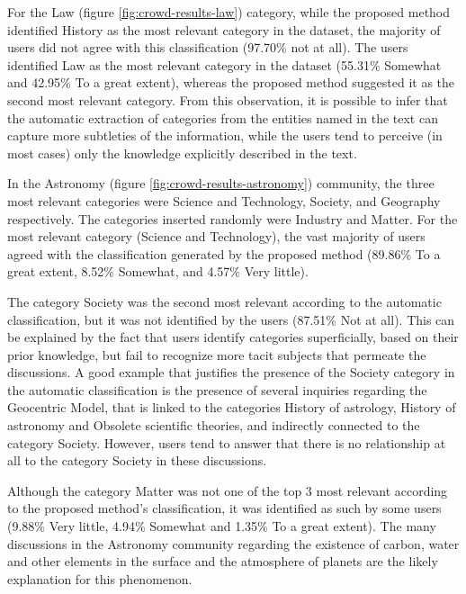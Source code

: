 For the Law (figure \ref{fig:crowd-results-law}) category, while the proposed method identified History as the most relevant category in the dataset, the majority of users did not agree with this classification (97.70\% not at all). 
The users identified Law as the most relevant category in the dataset (55.31\% Somewhat and 42.95\% To a great extent), whereas the proposed method suggested it as the second most relevant category. 
From this observation, it is possible to infer that the automatic extraction of categories from the entities named in the text can capture more subtleties of the information, while the users tend to perceive (in most cases) only the knowledge explicitly described in the text.


 
 \newpage
In the Astronomy (figure \ref{fig:crowd-results-astronomy}) community, the three most relevant categories were Science and Technology, Society, and Geography respectively. The categories inserted randomly were Industry and Matter. For the most relevant category (Science and Technology), the vast majority of users agreed with the classification generated by the proposed method (89.86\% To a great extent, 8.52\% Somewhat, and 4.57\% Very little).

The category Society was the second most relevant according to the automatic classification, but it was not identified by the users (87.51\% Not at all). This can be explained by the fact that users identify categories superficially, based on their prior knowledge, but fail to recognize more tacit subjects that permeate the discussions. A good example that justifies the presence of the Society category in the automatic classification is the presence of several inquiries regarding the Geocentric Model, that is linked to the categories History of astrology, History of astronomy and Obsolete scientific theories, and indirectly connected to the category Society.
However, users tend to answer that there is no relationship at all to the category Society in these discussions.

Although the category Matter was not one of the top 3 most relevant according to the proposed method's classification, it was identified as such by some users (9.88\% Very little, 4.94\% Somewhat and 1.35\% To a great extent). The many discussions in the Astronomy community regarding the existence of carbon, water and other elements in the surface and the atmosphere of planets are the likely explanation for this phenomenon. 


